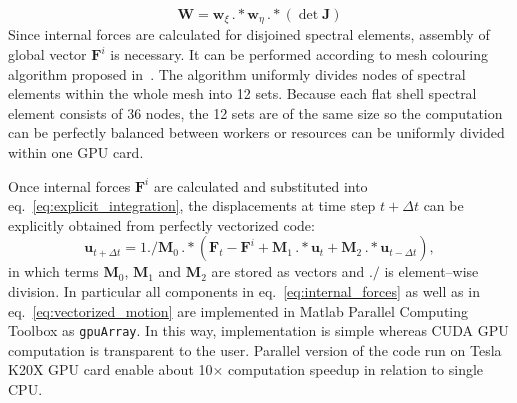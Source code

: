 \documentclass[preprint,12pt]{elsarticle}
\renewcommand{\vec}[1]{\mathbf{#1}}
\begin{document}
	\begin{equation}
	\vec{W} = \vec{w}_{\xi}\,.*\vec{w}_{\eta}\,.*\left(\det\vec{J}\right)
	\end{equation}
	Since internal forces are calculated for disjoined spectral elements, assembly of global vector $\vec{F}^i$ is necessary. It can be performed according to mesh colouring algorithm proposed in~\cite{Kudela2016}. The algorithm uniformly divides nodes of spectral elements within the whole mesh into 12 sets. Because each flat shell spectral element consists of 36 nodes, the 12 sets are of the same size so the computation can be perfectly balanced between workers or resources can be uniformly divided within one GPU card.
	
	Once internal forces $\vec{F}^i$ are calculated and substituted into eq.~\ref{eq:explicit_integration}, the displacements at time step $t+\Delta t$ can be explicitly obtained from perfectly vectorized code:
	\begin{equation}
	\vec{u}_{t+\Delta t}=1./\vec{M}_0\, .*\left(\vec{F}_t - \vec{F}^i +\vec{M}_1 \, .* \vec{u}_t +\vec{M}_2 \, .* \vec{u}_{t-\Delta t}\right),
	\label{eq:vectorized_motion}
	\end{equation} 
	in which terms $\vec{M}_0$, $\vec{M}_1$ and $\vec{M}_2$ are stored as vectors and $./$ is element--wise division. In particular all components in eq.~\ref{eq:internal_forces} as well as in eq.~\ref{eq:vectorized_motion} are implemented in Matlab Parallel Computing Toolbox as \verb|gpuArray|. In this way, implementation is simple whereas CUDA GPU computation is transparent to the user. Parallel version of the code run on Tesla K20X GPU card enable about 10$\times$ computation speedup in relation to single CPU. 
\end{document}
